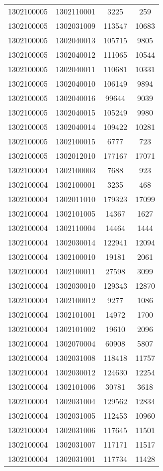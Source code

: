 \begin{longtable}{llcc}
1302100005 & 1302110001 & 3225 & 259\\
1302100005 & 1302031009 & 113547 & 10683\\
1302100005 & 1302040013 & 105715 & 9805\\
1302100005 & 1302040012 & 111065 & 10544\\
1302100005 & 1302040011 & 110681 & 10331\\
1302100005 & 1302040010 & 106149 & 9894\\
1302100005 & 1302040016 & 99644 & 9039\\
1302100005 & 1302040015 & 105249 & 9980\\
1302100005 & 1302040014 & 109422 & 10281\\
1302100005 & 1302100015 & 6777 & 723\\
1302100005 & 1302012010 & 177167 & 17071\\
1302100004 & 1302100003 & 7688 & 923\\
1302100004 & 1302100001 & 3235 & 468\\
1302100004 & 1302011010 & 179323 & 17099\\
1302100004 & 1302101005 & 14367 & 1627\\
1302100004 & 1302110004 & 14464 & 1444\\
1302100004 & 1302030014 & 122941 & 12094\\
1302100004 & 1302100010 & 19181 & 2061\\
1302100004 & 1302100011 & 27598 & 3099\\
1302100004 & 1302030010 & 129343 & 12870\\
1302100004 & 1302100012 & 9277 & 1086\\
1302100004 & 1302101001 & 14972 & 1700\\
1302100004 & 1302101002 & 19610 & 2096\\
1302100004 & 1302070004 & 60908 & 5807\\
1302100004 & 1302031008 & 118418 & 11757\\
1302100004 & 1302030012 & 124630 & 12254\\
1302100004 & 1302101006 & 30781 & 3618\\
1302100004 & 1302031004 & 129562 & 12834\\
1302100004 & 1302031005 & 112453 & 10960\\
1302100004 & 1302031006 & 117645 & 11501\\
1302100004 & 1302031007 & 117171 & 11517\\
1302100004 & 1302031001 & 117734 & 11428\\

\end{longtable}
